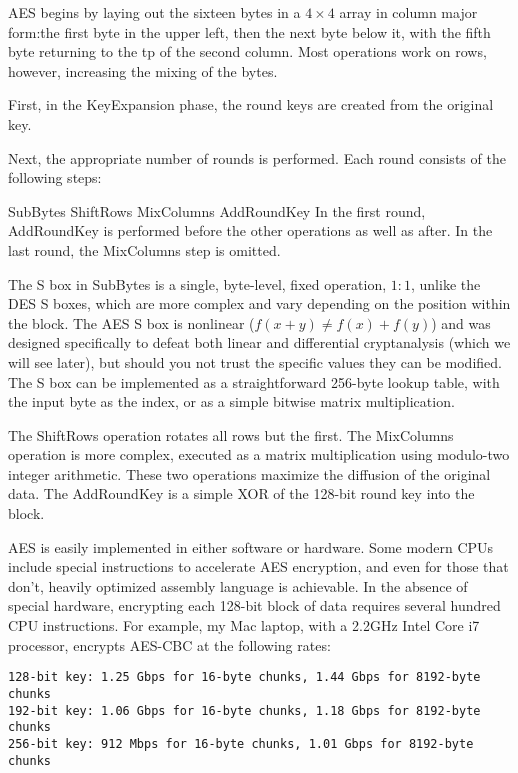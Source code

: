 \documentclass[%
 aip,
 jmp,%
 amsmath,amssymb,
 reprint,%
]{revtex4-1}
\begin{document}
AES begins by laying out the sixteen bytes in a $4\times 4$ array in column major form:the first byte in the upper left, then the next byte below it, with the fifth byte returning to the tp of the second column. Most operations work on rows, however, increasing the mixing of the bytes.

First, in the KeyExpansion phase, the round keys are created from the original key.

Next, the appropriate number of rounds is performed. Each round consists of the following steps:

SubBytes
ShiftRows
MixColumns
AddRoundKey
In the first round, AddRoundKey is performed before the other operations as well as after. In the last round, the MixColumns step is omitted.

The S box in SubBytes is a single, byte-level, fixed operation, $1:1$, unlike the DES S boxes, which are more complex and vary depending on the position within the block. The AES S box is nonlinear ($f(x+y) \ne f(x)+f(y)$) and was designed specifically to defeat both linear and differential cryptanalysis (which we will see later), but should you not trust the specific values they can be modified. The S box can be implemented as a straightforward 256-byte lookup table, with the input byte as the index, or as a simple bitwise matrix multiplication.

The ShiftRows operation rotates all rows but the first. The MixColumns operation is more complex, executed as a matrix multiplication using modulo-two integer arithmetic. These two operations maximize the diffusion of the original data. The AddRoundKey is a simple XOR of the 128-bit round key into the block.

AES is easily implemented in either software or hardware. Some modern CPUs include special instructions to accelerate AES encryption, and even for those that don't, heavily optimized assembly language is achievable.  In the absence of special hardware, encrypting each 128-bit block of data requires several hundred CPU instructions. For example, my Mac laptop, with a 2.2GHz Intel Core i7 processor, encrypts AES-CBC at the following rates:


\begin{verbatim}
128-bit key: 1.25 Gbps for 16-byte chunks, 1.44 Gbps for 8192-byte chunks
192-bit key: 1.06 Gbps for 16-byte chunks, 1.18 Gbps for 8192-byte chunks
256-bit key: 912 Mbps for 16-byte chunks, 1.01 Gbps for 8192-byte chunks
\end{verbatim}
\end{document}
